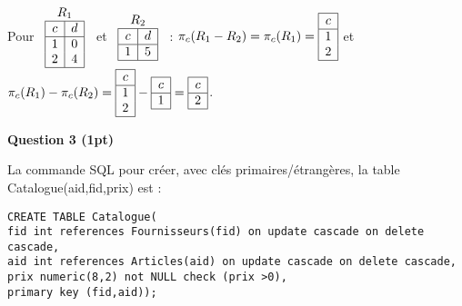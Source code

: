 \documentclass{article}
\begin{document}
\vspace{0.1cm}
\noindent
Pour 
  $
  \begin{array}{c}
    R_1 \\
    \begin{array}{|c|c|}
      \hline
      c & d \\
      \hline
      1 & 0 \\
      2 & 4 \\
      \hline
    \end{array}
  \end{array}$
  et
  $
  \begin{array}{c}
    R_2 \\
    \begin{array}{|c|c|}
      \hline
      c & d \\
      \hline
      1 & 5 \\
      \hline
    \end{array}
  \end{array}$ :
  $\pi_{c}(R_1-R_2) = \pi_{c}(R_1) =
  \begin{array}{|c|}
    \hline
    c \\
    \hline
    1 \\
    2 \\
    \hline
  \end{array}
  $
et
  $\pi_{c}(R_1)-\pi_{c}(R_2) = 
  \begin{array}{|c|}
    \hline
    c \\
    \hline
    1 \\
    2 \\
    \hline
  \end{array}
  -
  \begin{array}{|c|}
    \hline
    c \\
    \hline
    1 \\
    \hline
  \end{array}
  =
  \begin{array}{|c|}
    \hline
    c \\
    \hline
    2 \\
    \hline
  \end{array}$.

\vspace{0.3cm}
\noindent
\textbf{Question 3 (1pt)}

\noindent
La commande SQL pour créer, avec clés primaires/étrangères, la table Catalogue(aid,fid,prix) est :
\begin{verbatim}
CREATE TABLE Catalogue(
fid int references Fournisseurs(fid) on update cascade on delete cascade,   
aid int references Articles(aid) on update cascade on delete cascade, 
prix numeric(8,2) not NULL check (prix >0),
primary key (fid,aid));
\end{verbatim}
\end{document}
